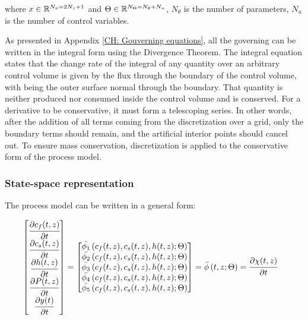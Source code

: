 \documentclass[../Article_Model_Parameters.tex]{subfiles}
\begin{document}
		where ${\color{black}x} \in \mathbb{R}^{N_x = 2N_z+1} $ and ${\color{black}\Theta} \in \mathbb{R}^{N_\Theta =  N_{\theta} + N_u } $, $N_{\theta}$ is the number of parameters, $N_{u}$ is the number of control variables.
		
		As presented in Appendix \ref{CH: Gouverning equations}, all the governing can be written in the integral form using the Divergence Theorem. The integral equation states that the change rate of the integral of any quantity over an arbitrary control volume is given by the flux through the boundary of the control volume, with being the outer surface normal through the boundary. That quantity is neither produced nor consumed inside the control volume and is conserved. For a derivative to be conservative, it must form a telescoping series. In other words, after the addition of all terms coming from the discretization over a grid, only the boundary terms should remain, and the artificial interior points should cancel out. To ensure mass conservation, discretization is applied to the conservative form of the process model.
	
		\iffalse
		\subsubsection{State-space representation} \label{CH: State_space}
			
		The process model can be written in a general form:
			
		{\footnotesize
			\begin{align}
				\begin{bmatrix}
					\cfrac{\partial {\color{black}c_f}(t,z)}{\partial t}\\
					\cfrac{\partial {\color{black}c_s}(t,z)}{\partial t}\\
					\cfrac{\partial {\color{black}h}(t,z)}{\partial t} \\
					\cfrac{\partial {\color{black}P}(t,z)}{\partial t} \\
					\cfrac{\partial {\color{black}y}(t)}{\partial t} 
				\end{bmatrix}
				& =
				\begin{bmatrix}
					{\color{black}\bar{\phi_1}} \left( {\color{black}c_f}(t,z),{\color{black}c_s}(t,z),{\color{black}h}(t,z); {\color{black}\Theta} \right)\\
					{\color{black}\bar{\phi_2}} \left( {\color{black}c_f}(t,z),{\color{black}c_s}(t,z),{\color{black}h}(t,z); {\color{black}\Theta} \right)\\
					{\color{black}\bar{\phi_3}} \left( {\color{black}c_f}(t,z),{\color{black}c_s}(t,z),{\color{black}h}(t,z); {\color{black}\Theta} \right) \\
					{\color{black}\bar{\phi_4}} \left( {\color{black}c_f}(t,z),{\color{black}c_s}(t,z),{\color{black}h}(t,z); {\color{black}\Theta} \right)\\
					{\color{black}\bar{\phi_5}} \left( {\color{black}c_f}(t,z),{\color{black}c_s}(t,z),{\color{black}h}(t,z); {\color{black}\Theta} \right)
				\end{bmatrix} = {\color{black}\bar{\phi}} \left( t,z; {\color{black}\Theta} \right) = \cfrac{\partial {\color{black}\chi}(t,z)}{\partial t}
		\end{align} }
			
\end{document}
